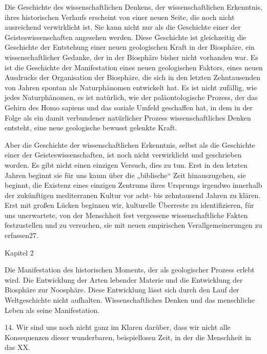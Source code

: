 \documentclass[11pt,a4paper]{book}
\begin{document}
Die Geschichte des wissenschaftlichen Denkens, der wissenschaftlichen Erkenntnis, ihres historischen Verlaufs erscheint von einer neuen Seite, die noch nicht ausreichend verwirklicht ist. Sie kann nicht nur als die Geschichte einer der Geisteswissenschaften angesehen werden. Diese Geschichte ist gleichzeitig die Geschichte der Entstehung einer neuen geologischen Kraft in der Biosphäre, ein wissenschaftlicher Gedanke, der in der Biosphäre bisher nicht vorhanden war. Es ist die Geschichte der Manifestation eines neuen geologischen Faktors, eines neuen Ausdrucks der Organisation der Biosphäre, die sich in den letzten Zehntausenden von Jahren spontan als Naturphänomen entwickelt hat. Es ist nicht zufällig, wie jedes Naturphänomen, es ist natürlich, wie der paläontologische Prozess, der das Gehirn des Homo sapiens und das soziale Umfeld geschaffen hat, in dem in der Folge als ein damit verbundener natürlicher Prozess wissenschaftliches Denken entsteht, eine neue geologische bewusst gelenkte Kraft. 

Aber die Geschichte der wissenschaftlichen Erkenntnis, selbst als die Geschichte einer der Geisteswissenschaften, ist noch nicht verwirklicht und geschrieben worden. Es gibt nicht einen einzigen Versuch, dies zu tun. Erst in den letzten Jahren beginnt sie für uns kaum über die „biblische“ Zeit hinauszugehen, sie beginnt, die Existenz eines einzigen Zentrums ihres Ursprungs irgendwo innerhalb der zukünftigen mediterranen Kultur vor acht- bis zehntausend Jahren zu klären. Erst mit großen Lücken beginnen wir, kulturelle Überreste zu identifizieren, für uns unerwartete, von der Menschheit fest vergessene wissenschaftliche Fakten festzustellen und zu versuchen, sie mit neuen empirischen Verallgemeinerungen zu erfassen27. 



Kapitel 2 



Die Manifestation des historischen Moments, der als geologischer Prozess erlebt wird. Die Entwicklung der Arten lebender Materie und die Entwicklung der Biosphäre zur Noosphäre. Diese Entwicklung lässt sich durch den Lauf der Weltgeschichte nicht aufhalten. Wissenschaftliches Denken und das menschliche Leben als seine Manifestation. 





14. Wir sind uns noch nicht ganz im Klaren darüber, dass wir nicht alle Konsequenzen dieser wunderbaren, beispiellosen Zeit, in der die Menschheit in das XX. 
\end{document}
